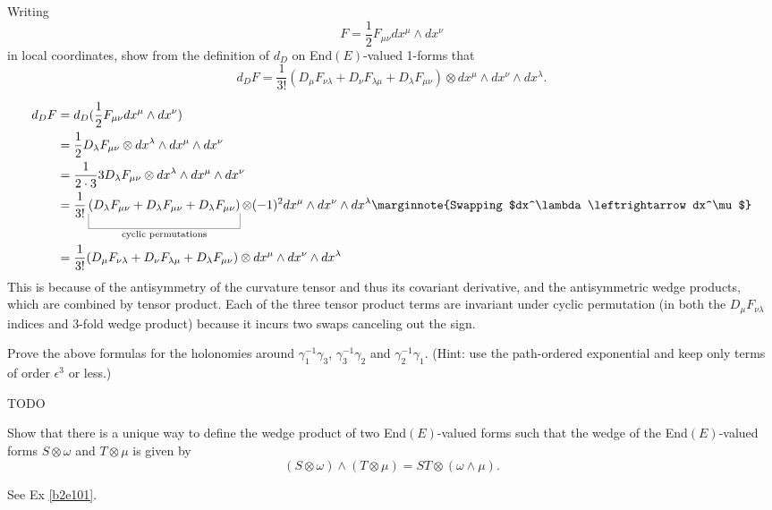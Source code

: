 \documentclass[10pt]{article}
\begin{document}
\begin{example}
	Writing
	$$
	F = \frac12 F_{\mu\nu} dx^\mu \wedge dx^\nu
	$$
	in local coordinates, show from the definition of $d_D$ on End$(E)$-valued 1-forms that
	$$
	d_DF=\frac{1}{3!}(D_\mu F_{\nu\lambda} + D_\nu F_{\lambda\mu} + D_\lambda F_{\mu\nu}) \otimes dx^\mu \wedge dx^\nu \wedge dx^\lambda.
	$$
\end{example}
\sol $$
\begin{aligned}
	d_DF &= d_D(\frac12 F_{\mu\nu} dx^\mu \wedge dx^\nu)\\
	&= \frac12 D_\lambda F_{\mu\nu} \otimes dx^\lambda \wedge dx^\mu \wedge dx^\nu\\
	&= \frac{1}{2\cdot 3} 3D_\lambda F_{\mu\nu} \otimes dx^\lambda \wedge dx^\mu \wedge dx^\nu\\
	&= \frac{1}{3!} \ub{(D_\lambda F_{\mu\nu} + D_\lambda F_{\mu\nu} + D_\lambda F_{\mu\nu})}{\text{cyclic permutations}} \otimes (-1)^2 dx^\mu \wedge dx^\nu \wedge dx^\lambda\marginnote{Swapping $dx^\lambda \leftrightarrow dx^\mu$}\\
	&= \frac{1}{3!}(D_\mu F_{\nu\lambda} + D_\nu F_{\lambda\mu} + D_\lambda F_{\mu\nu}) \otimes dx^\mu \wedge dx^\nu \wedge dx^\lambda
\end{aligned}
$$
This is because of the antisymmetry of the curvature tensor and thus its covariant derivative, and the antisymmetric wedge products, which are combined by tensor product. Each of the three tensor product terms are invariant under cyclic permutation (in both the $D_\mu F_{\nu\lambda}$ indices and 3-fold wedge product) because it incurs two swaps canceling out the sign.


\begin{example}
	Prove the above formulas for the holonomies around $\gamma_1^{-1}\gamma_3$, $\gamma_3^{-1}\gamma_2$ and $\gamma_2^{-1}\gamma_1$. (Hint: use the path-ordered exponential and keep only terms of order $\epsilon^3$ or less.)
\end{example}
\sol TODO


\begin{example}
	Show that there is a unique way to define the wedge product of two End$(E)$-valued forms such that the wedge of the End$(E)$-valued forms $S \otimes \omega$ and $T \otimes \mu$ is given by
	$$
	(S \otimes \omega) \wedge (T \otimes \mu) = ST \otimes (\omega \wedge \mu).
	$$
\end{example}
\sol See Ex \ref{b2e101}.
\end{document}
